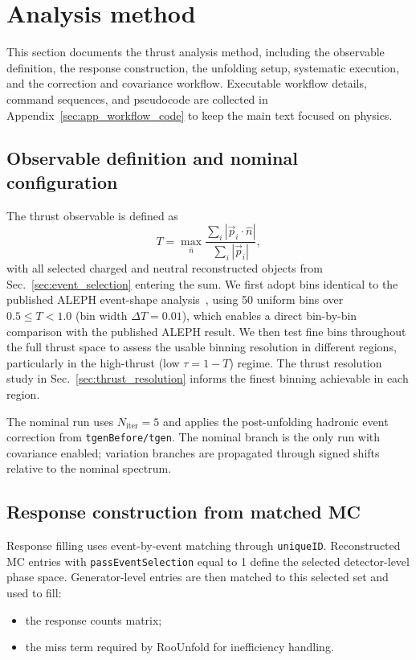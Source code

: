 \section{Analysis method}
\label{sec:method}

This section documents the thrust analysis method, including the observable
definition, the response construction, the unfolding setup, systematic execution,
and the correction and covariance workflow. Executable workflow details, command
sequences, and pseudocode are collected in
Appendix~\ref{sec:app_workflow_code} to keep the main text focused on physics.

\subsection{Observable definition and nominal configuration}

The thrust observable is defined as~\cite{PhysRevLett.39.1587}
\begin{equation}
T = \max_{\hat{n}} \frac{\sum_i |\vec{p}_i \cdot \hat{n}|}{\sum_i |\vec{p}_i|},
\end{equation}
with all selected charged and neutral reconstructed objects from Sec.~\ref{sec:event_selection} entering the sum.
We first adopt bins identical to the published ALEPH event-shape analysis~\cite{Heister:2003aj}, using 50 uniform bins over $0.5 \le T < 1.0$ (bin width $\Delta T = 0.01$), which enables a direct bin-by-bin comparison with the published ALEPH result. We then test fine bins throughout the full thrust space to assess the usable binning resolution in different regions, particularly in the high-thrust (low $\tau = 1-T$) regime. The thrust resolution study in Sec.~\ref{sec:thrust_resolution} informs the finest binning achievable in each region.



The nominal run uses $N_{\mathrm{iter}}=5$ and applies the post-unfolding hadronic event correction from
\texttt{tgenBefore/tgen}.
The nominal branch is the only run with covariance enabled; variation branches are propagated through signed shifts relative to the nominal spectrum.

\subsection{Response construction from matched MC}

Response filling uses event-by-event matching through \texttt{uniqueID}. Reconstructed MC entries with
\texttt{passEventSelection} equal to 1 define the selected detector-level phase space. Generator-level entries are then matched to this selected set and used to fill:
\begin{itemize}
\item the response counts matrix;
\item the miss term required by RooUnfold for inefficiency handling.
\end{itemize}

